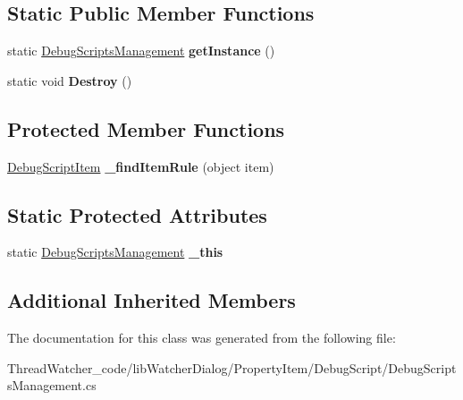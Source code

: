 \subsection*{Static Public Member Functions}
\begin{DoxyCompactItemize}
\item 
\hypertarget{classlib_watcher_dialog_1_1_property_item_1_1_debug_script_1_1_debug_scripts_management_a7b5b0e60cea9a5bb1d565cf0e11042f7}{static \hyperlink{classlib_watcher_dialog_1_1_property_item_1_1_debug_script_1_1_debug_scripts_management}{Debug\+Scripts\+Management} {\bfseries get\+Instance} ()}\label{classlib_watcher_dialog_1_1_property_item_1_1_debug_script_1_1_debug_scripts_management_a7b5b0e60cea9a5bb1d565cf0e11042f7}

\item 
\hypertarget{classlib_watcher_dialog_1_1_property_item_1_1_debug_script_1_1_debug_scripts_management_ac5ac60870b653af5b5522594b9012722}{static void {\bfseries Destroy} ()}\label{classlib_watcher_dialog_1_1_property_item_1_1_debug_script_1_1_debug_scripts_management_ac5ac60870b653af5b5522594b9012722}

\end{DoxyCompactItemize}
\subsection*{Protected Member Functions}
\begin{DoxyCompactItemize}
\item 
\hypertarget{classlib_watcher_dialog_1_1_property_item_1_1_debug_script_1_1_debug_scripts_management_a28b6be7455f1777a97d5ab9c21e6dd77}{\hyperlink{classlib_watcher_dialog_1_1_property_item_1_1_debug_script_1_1_debug_script_item}{Debug\+Script\+Item} {\bfseries \+\_\+find\+Item\+Rule} (object item)}\label{classlib_watcher_dialog_1_1_property_item_1_1_debug_script_1_1_debug_scripts_management_a28b6be7455f1777a97d5ab9c21e6dd77}

\end{DoxyCompactItemize}
\subsection*{Static Protected Attributes}
\begin{DoxyCompactItemize}
\item 
\hypertarget{classlib_watcher_dialog_1_1_property_item_1_1_debug_script_1_1_debug_scripts_management_a282cdddea9a67f58737cea5d93cdd523}{static \hyperlink{classlib_watcher_dialog_1_1_property_item_1_1_debug_script_1_1_debug_scripts_management}{Debug\+Scripts\+Management} {\bfseries \+\_\+this}}\label{classlib_watcher_dialog_1_1_property_item_1_1_debug_script_1_1_debug_scripts_management_a282cdddea9a67f58737cea5d93cdd523}

\end{DoxyCompactItemize}
\subsection*{Additional Inherited Members}


The documentation for this class was generated from the following file\+:\begin{DoxyCompactItemize}
\item 
Thread\+Watcher\+\_\+code/lib\+Watcher\+Dialog/\+Property\+Item/\+Debug\+Script/Debug\+Scripts\+Management.\+cs\end{DoxyCompactItemize}
